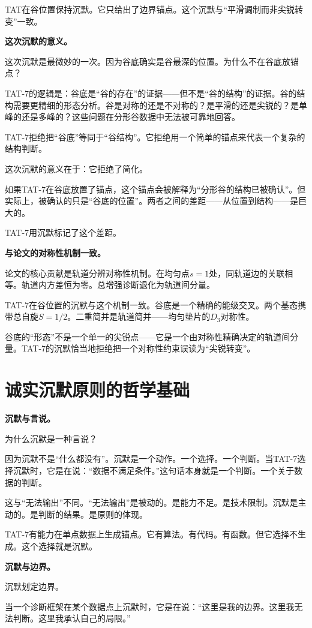 \documentclass[11pt,a4paper]{book}
\theoremstyle{definition}
\begin{document}
TAT在谷位置保持沉默。它只给出了边界锚点。这个沉默与“平滑调制而非尖锐转变”一致。

\textbf{这次沉默的意义。}

这次沉默是最微妙的一次。因为谷底确实是谷最深的位置。为什么不在谷底放锚点？

TAT-7的逻辑是：谷底是“谷的存在”的证据——但不是“谷的结构”的证据。谷的结构需要更精细的形态分析。谷是对称的还是不对称的？是平滑的还是尖锐的？是单峰的还是多峰的？这些问题在分形谷数据中无法被可靠地回答。

TAT-7拒绝把“谷底”等同于“谷结构”。它拒绝用一个简单的锚点来代表一个复杂的结构判断。

这次沉默的意义在于：它拒绝了简化。

如果TAT-7在谷底放置了锚点，这个锚点会被解释为“分形谷的结构已被确认”。但实际上，被确认的只是“谷底的位置”。两者之间的差距——从位置到结构——是巨大的。

TAT-7用沉默标记了这个差距。

\textbf{与论文的对称性机制一致。}

论文的核心贡献是轨道分辨对称性机制。在均匀点$s=1$处，同轨道边的关联相等。轨道内方差恒为零。总增强诊断退化为轨道间分量。

TAT-7在谷位置的沉默与这个机制一致。谷底是一个精确的能级交叉。两个基态携带总自旋$S=1/2$。二重简并是轨道简并——均匀垫片的$D_3$对称性。

谷底的“形态”不是一个单一的尖锐点——它是一个由对称性精确决定的轨道间分量。TAT-7的沉默恰当地拒绝把一个对称性约束误读为“尖锐转变”。

\section{诚实沉默原则的哲学基础}

\textbf{沉默与言说。}

为什么沉默是一种言说？

因为沉默不是“什么都没有”。沉默是一个动作。一个选择。一个判断。当TAT-7选择沉默时，它是在说：“数据不满足条件。”这句话本身就是一个判断。一个关于数据的判断。

这与“无法输出”不同。“无法输出”是被动的。是能力不足。是技术限制。沉默是主动的。是判断的结果。是原则的体现。

TAT-7有能力在单点数据上生成锚点。它有算法。有代码。有函数。但它选择不生成。这个选择就是沉默。

\textbf{沉默与边界。}

沉默划定边界。

当一个诊断框架在某个数据点上沉默时，它是在说：“这里是我的边界。这里我无法判断。这里我承认自己的局限。”
\end{document}
